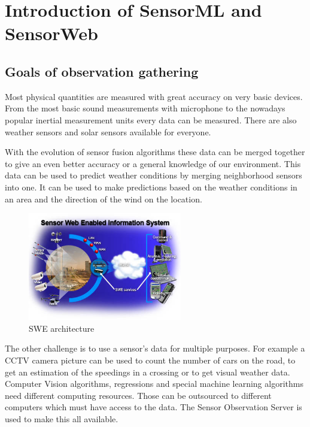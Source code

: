 \chapter{Introduction of SensorML and SensorWeb}\label{sect:Introduction}
\section{Goals of observation gathering}
Most physical quantities are measured with great accuracy on very basic devices. From the most basic sound measurements with microphone to the nowadays popular inertial measurement units every data can be measured. There are also weather sensors and solar sensors available for everyone.

 With the evolution of sensor fusion algorithms these data can be merged together to give an even better accuracy or a general knowledge of our environment. This data can be used to predict weather conditions by merging neighborhood sensors into one. It can be used to make predictions based on the weather conditions in an area and the direction of the wind on the location.
 
 \begin{figure}[h]
 \centering
  \includegraphics[width=0.6\textwidth]{figures/webswe.png}
 \caption{SWE architecture\label{fig:webswe}}
 \end{figure}
 
 
 The other challenge is to use a sensor's data for multiple purposes. For example a CCTV camera picture can be used to count the number of cars on the road, to get an estimation of the speedings in a crossing or to get visual weather data. Computer Vision algorithms, regressions and special machine learning algorithms need different computing resources. Those can be outsourced to different computers which must have access to the data. The Sensor Observation Server is used to make this all available.
 
